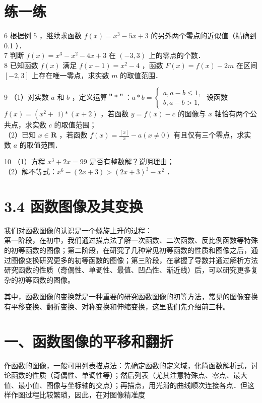 \documentclass[10pt]{article}
\begin{document}
\section*{练一练}
6 根据例 5 ，继续求函数 \(f(x)=x^{3}-5 x+3\) 的另外两个零点的近似值（精确到 0.1 ）．\\
7 判断 \(f(x)=x^{3}-x^{2}-4 x+3\) 在 \((-3,3)\) 上的零点的个数．\\
8 已知函数 \(f(x)\) 满足 \(f(x+1)=x^{2}-4\) ，函数 \(F(x)=f(x)-2 m\) 在区间 \([-2,3]\) 上存在唯一零点，求实数 \(m\) 的取值范围．

9 （1）对实数 \(a\) 和 \(b\) ，定义运算＂\(*\)＂：\(a * b=\left\{\begin{array}{l}a, a-b \leqslant 1, \\ b, a-b>1,\end{array}\right.\) 设函数 \(f(x)=\left(x^{2}+\right.\) \(1) *(x+2)\) ，若函数 \(y=f(x)-c\) 的图像与 \(x\) 轴恰有两个公共点，求实数 \(c\) 的取值范围；\\
（2）已知 \(x \in \mathbf{R}\) ，若函数 \(f(x)=\frac{[x]}{x}-a(x \neq 0)\) 有且仅有三个零点，求实数 \(a\) 的取值范围．

10 （1）方程 \(x^{3}+2 x=99\) 是否有整数解？说明理由；\\
（2）解不等式：\(x^{6}-(2 x+3)>(2 x+3)^{3}-x^{2}\) ．

\section*{3.4 函数图像及其变换}
我们对函数图像的认识是一个螺旋上升的过程：\\
第一阶段，在初中，我们通过描点法了解一次函数、二次函数、反比例函数等特殊的初等函数的图像；第二阶段，在研究了几种常见初等函数的性质和图像之后，通过图像变换研究更多的初等函数的图像；第三阶段，在掌握了导数并通过解析方法研究函数的性质（奇偶性、单调性、最值、凹凸性、渐近线）后，可以研究更多复杂的初等函数的图像。

其中，函数图像的变换就是一种重要的研究函数图像的初等方法，常见的图像变换有平移变换、翻折变换、对称变换和伸缩变换，这里我们先介绍前三种。

\section*{一、函数图像的平移和翻折}
作函数的图像，一般可用列表描点法：先确定函数的定义域，化简函数解析式，讨论函数的性质（奇偶性、单调性等）；然后列表（尤其注意特殊点、零点、最大值、最小值、图像与坐标轴的交点）；再描点，用光滑的曲线顺次连接各点．但这样作图过程比较繁琐，因此，在对图像精准度
\end{document}
